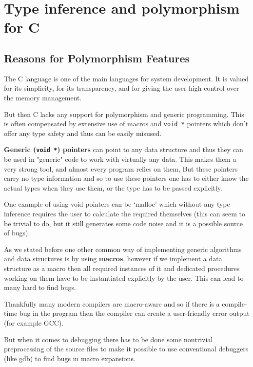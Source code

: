 \chapter{Type inference and polymorphism for C}

\section{Reasons for Polymorphism Features}

The C language is one of the main languages for system development. It is valued for its simplicity, for its transparency, and for giving the user high control over the memory management.

But then C lacks any support for polymorphism and generic programming. This is often compensated by extensive use of macros and \lstinline{void *} pointers which don't offer any type safety and thus can be easily misused.

\textbf{Generic (\lstinline{void *}) pointers} can point to any data structure and thus they can be used in "generic" code to work with virtually any data. This makes them a very strong tool, and almost every program relies on them, %
But these pointers carry no type information and so to use these pointers one has to either know the actual types when they use them, or the type has to be passed explicitly.

One example of using void pointers can be `malloc' which without any type inference requires the user to calculate the required themselves (this can seem to be trivial to do, but it still generates some code noise and it is a possible source of bugs).

As we stated before one other common way of implementing generic algorithms and data structures is by using \textbf{macros}, however if we implement a data structure as a macro then all required instances of it and dedicated procedures working on them have to be instantiated explicitly by the user. This can lead to many hard to find bugs.

Thankfully many modern compilers are macro-aware and so if there is a compile-time bug in the program then the compiler can create a user-friendly error output (for example GCC). %

But when it comes to debugging there has to be done some nontrivial preprocessing of the source files to make it possible to use conventional debuggers (like gdb) to find bugs in macro expansions. %

